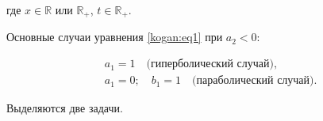 где $x\in \mathbb R$ или $ \mathbb R_+$, $t\in \mathbb R_+$. 

Основные случаи уравнения \eqref{kogan:eq1} при $a_2<0$:

\begin{equation}

\label{kogan:eq2}

\begin{aligned}

& a_1 =1 \quad \text{(гиперболический случай)},\\

& a_1 =0;\quad b_1 =1 \quad \text{(параболический случай)}.

\end{aligned}

\end{equation}



Выделяются две задачи.



